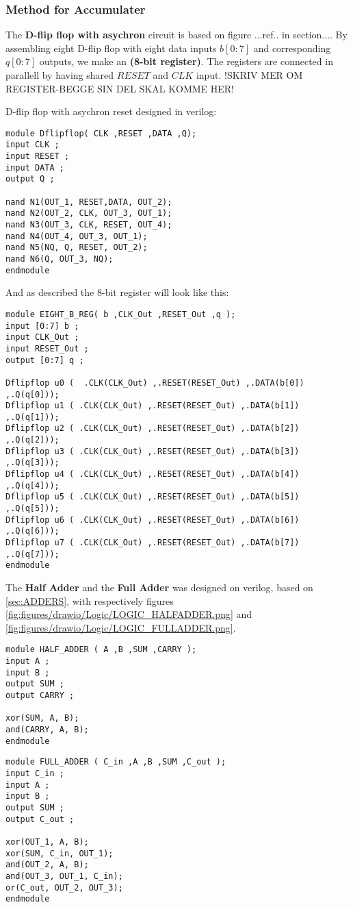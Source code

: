 \subsubsection{Method for Accumulater}
 
The \textbf{D-flip flop with asychron} circuit is based on figure ...ref.. in section.... By assembling eight D-flip flop with eight data inputs $b[0:7]$ and corresponding $q[0:7]$ outputs, we make an \textbf{(8-bit register)}. The registers are connected in parallell by having shared $RESET$ and $CLK$ input. 
!SKRIV MER OM REGISTER-BEGGE SIN DEL SKAL KOMME HER!

D-flip flop with asychron reset designed in verilog:
\begin{lstlisting}
module Dflipflop( CLK ,RESET ,DATA ,Q);
input CLK ;
input RESET ;
input DATA ;
output Q ;

nand N1(OUT_1, RESET,DATA, OUT_2);
nand N2(OUT_2, CLK, OUT_3, OUT_1);
nand N3(OUT_3, CLK, RESET, OUT_4);
nand N4(OUT_4, OUT_3, OUT_1);
nand N5(NQ, Q, RESET, OUT_2);
nand N6(Q, OUT_3, NQ);
endmodule
\end{lstlisting}
And as described the 8-bit register will look like this:

\begin{lstlisting}
module EIGHT_B_REG( b ,CLK_Out ,RESET_Out ,q );
input [0:7] b ;
input CLK_Out ;
input RESET_Out ;
output [0:7] q ;

Dflipflop u0 (	.CLK(CLK_Out) ,.RESET(RESET_Out) ,.DATA(b[0]) ,.Q(q[0])); 
Dflipflop u1 ( .CLK(CLK_Out) ,.RESET(RESET_Out) ,.DATA(b[1]) ,.Q(q[1]));
Dflipflop u2 ( .CLK(CLK_Out) ,.RESET(RESET_Out) ,.DATA(b[2]) ,.Q(q[2]));
Dflipflop u3 ( .CLK(CLK_Out) ,.RESET(RESET_Out) ,.DATA(b[3]) ,.Q(q[3]));
Dflipflop u4 ( .CLK(CLK_Out) ,.RESET(RESET_Out) ,.DATA(b[4]) ,.Q(q[4]));
Dflipflop u5 ( .CLK(CLK_Out) ,.RESET(RESET_Out) ,.DATA(b[5]) ,.Q(q[5]));
Dflipflop u6 ( .CLK(CLK_Out) ,.RESET(RESET_Out) ,.DATA(b[6]) ,.Q(q[6]));
Dflipflop u7 ( .CLK(CLK_Out) ,.RESET(RESET_Out) ,.DATA(b[7]) ,.Q(q[7]));
endmodule
\end{lstlisting}

The \textbf{Half Adder} and the \textbf{Full Adder} was designed on verilog, based on \ref{sec:ADDERS}, with respectively figures \ref{fig:figures/drawio/Logic/LOGIC_HALFADDER.png} and \ref{fig:figures/drawio/Logic/LOGIC_FULLADDER.png}.
\begin{lstlisting}
module HALF_ADDER ( A ,B ,SUM ,CARRY );
input A ;
input B ;
output SUM ;
output CARRY ;

xor(SUM, A, B);
and(CARRY, A, B);
endmodule
\end{lstlisting}
\begin{lstlisting}
module FULL_ADDER ( C_in ,A ,B ,SUM ,C_out );
input C_in ;
input A ;
input B ;
output SUM ;
output C_out ;

xor(OUT_1, A, B);
xor(SUM, C_in, OUT_1);
and(OUT_2, A, B);
and(OUT_3, OUT_1, C_in);
or(C_out, OUT_2, OUT_3);
endmodule
\end{lstlisting}

